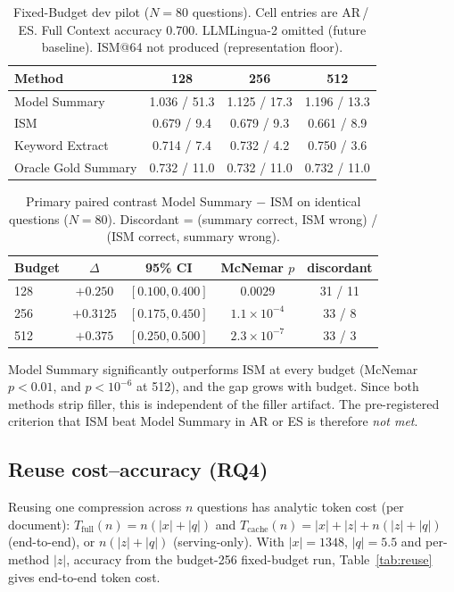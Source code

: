 \documentclass{article}
\begin{document}
\begin{table}[t]
\centering
\caption{Fixed-Budget dev pilot (\(N{=}80\) questions). Cell entries are AR\,/\,ES.
Full Context accuracy $0.700$. LLMLingua-2 omitted (future baseline). ISM@64 not
produced (representation floor).}
\label{tab:fixedbudget}
\begin{tabular}{lccc}
\toprule
Method & 128 & 256 & 512 \\
\midrule
Model Summary       & 1.036 / 51.3 & 1.125 / 17.3 & 1.196 / 13.3 \\
ISM                 & 0.679 / 9.4  & 0.679 / 9.3  & 0.661 / 8.9 \\
Keyword Extract     & 0.714 / 7.4  & 0.732 / 4.2  & 0.750 / 3.6 \\
Oracle Gold Summary & 0.732 / 11.0 & 0.732 / 11.0 & 0.732 / 11.0 \\
\bottomrule
\end{tabular}
\end{table}

\begin{table}[t]
\centering
\caption{Primary paired contrast Model Summary $-$ ISM on identical questions
(\(N{=}80\)). Discordant = (summary correct, ISM wrong) / (ISM correct, summary
wrong).}
\label{tab:paired}
\begin{tabular}{lcccc}
\toprule
Budget & $\Delta$ & 95\% CI & McNemar $p$ & discordant \\
\midrule
128 & $+0.250$  & $[0.100,0.400]$ & $0.0029$            & 31 / 11 \\
256 & $+0.3125$ & $[0.175,0.450]$ & $1.1\times10^{-4}$  & 33 / 8 \\
512 & $+0.375$  & $[0.250,0.500]$ & $2.3\times10^{-7}$  & 33 / 3 \\
\bottomrule
\end{tabular}
\end{table}

Model Summary significantly outperforms ISM at every budget (McNemar $p<0.01$, and
$p<10^{-6}$ at 512), and the gap grows with budget. Since both methods strip
filler, this is independent of the filler artifact. The pre-registered criterion
that ISM beat Model Summary in AR or ES is therefore \emph{not met}.

\subsection{Reuse cost--accuracy (RQ4)}
\label{sec:reuse}
Reusing one compression across $n$ questions has analytic token cost (per
document): $T_{\mathrm{full}}(n)=n(|x|+|q|)$ and
$T_{\mathrm{cache}}(n)=|x|+|z|+n(|z|+|q|)$ (end-to-end), or $n(|z|+|q|)$
(serving-only). With $|x|{=}1348$, $|q|{=}5.5$ and per-method $|z|$, accuracy from
the budget-256 fixed-budget run, Table~\ref{tab:reuse} gives end-to-end token cost.
\end{document}
